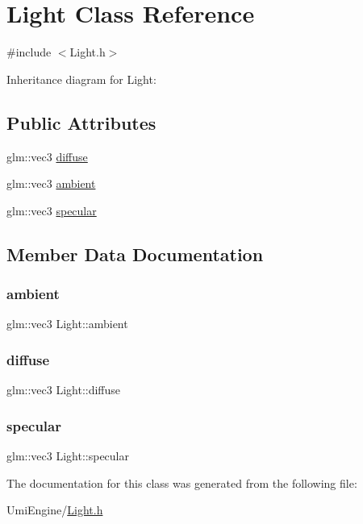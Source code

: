 \hypertarget{class_light}{}\section{Light Class Reference}
\label{class_light}


{\ttfamily \#include $<$Light.\+h$>$}



Inheritance diagram for Light\+:
\subsection*{Public Attributes}
\begin{DoxyCompactItemize}
\item 
glm\+::vec3 \mbox{\hyperlink{class_light_ad47b5347556fd8cd9ebdc60fdfed196b}{diffuse}}
\item 
glm\+::vec3 \mbox{\hyperlink{class_light_afaa34bb2efc167adcb2055359fd08a49}{ambient}}
\item 
glm\+::vec3 \mbox{\hyperlink{class_light_aefcfb83a0540ddb885c2622061b28d7e}{specular}}
\end{DoxyCompactItemize}


\subsection{Member Data Documentation}
\mbox{\label{class_light_afaa34bb2efc167adcb2055359fd08a49}} 
\subsubsection{\texorpdfstring{ambient}{ambient}}
{\footnotesize\ttfamily glm\+::vec3 Light\+::ambient}

\mbox{\label{class_light_ad47b5347556fd8cd9ebdc60fdfed196b}} 
\subsubsection{\texorpdfstring{diffuse}{diffuse}}
{\footnotesize\ttfamily glm\+::vec3 Light\+::diffuse}

\mbox{\label{class_light_aefcfb83a0540ddb885c2622061b28d7e}} 
\subsubsection{\texorpdfstring{specular}{specular}}
{\footnotesize\ttfamily glm\+::vec3 Light\+::specular}



The documentation for this class was generated from the following file\+:\begin{DoxyCompactItemize}
\item 
Umi\+Engine/\mbox{\hyperlink{_light_8h}{Light.\+h}}\end{DoxyCompactItemize}
